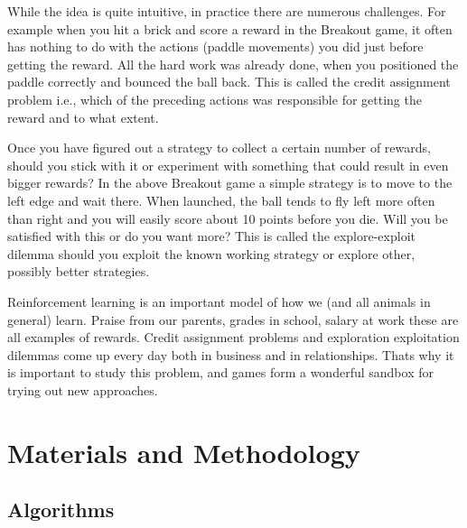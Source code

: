 \documentclass[a4paper,11pt]{report}
\begin{document}
			While the idea is quite intuitive, in practice there are numerous challenges. For example when you hit a brick and score a reward in the Breakout game, it often has nothing to do with the actions (paddle movements) you did just before getting the reward. All the hard work was already done, when you positioned the paddle correctly and bounced the ball back. This is called the credit assignment problem i.e., which of the preceding actions was responsible for getting the reward and to what extent.

			Once you have figured out a strategy to collect a certain number of rewards, should you stick with it or experiment with something that could result in even bigger rewards? In the above Breakout game a simple strategy is to move to the left edge and wait there. When launched, the ball tends to fly left more often than right and you will easily score about 10 points before you die. Will you be satisfied with this or do you want more? This is called the explore-exploit dilemma should you exploit the known working strategy or explore other, possibly better strategies.

			Reinforcement learning is an important model of how we (and all animals in general) learn. Praise from our parents, grades in school, salary at work these are all examples of rewards. Credit assignment problems and exploration exploitation dilemmas come up every day both in business and in relationships. Thats why it is important to study this problem, and games form a wonderful sandbox for trying out new approaches.

	\newpage
	\chapter{Materials and Methodology}
		\section{Algorithms}
\end{document}
